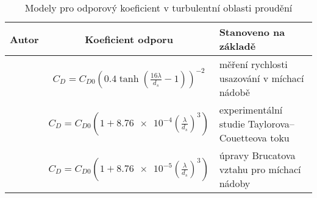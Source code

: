 \begin{table}[h!]
\begin{center}
  

		\caption{Modely pro odporový koeficient v turbulentní oblasti proudění}
		\label{tab:cds}
\begin{tabular}{|c|c|>{\centering\arraybackslash}p{5cm}|}
  \hline
  
{\textbf{Autor}} & {\textbf{Koeficient odporu}} & {\textbf{Stanoveno na základě}} \\ \hline{}

\citet{pin01} & \label{eq:pin} $C_{D} = C_{D0} \left( \num{0.4}\tanh\left(  \frac{16\lambda}{d_{s}} - 1  \right) \right) ^{-2}$ & měření rychlosti usazování v míchací nádobě \\ \hline
 
\citet{bru98} & \label{eq:bru} $C_{D} = C_{D0} \left( 1 + \num{8.76e-4} \left( \frac{\lambda}{d_{s}} \right)^{3} \right)$ & experimentální studie Taylorova–Couetteova toku \\ \hline 

\citet{kho06} & \label{eq:kho} $C_{D} = C_{D0} \left( 1 + \num{8.76e-5} \left( \frac{\lambda}{d_{s}} \right)^{3} \right)$ & úpravy Brucatova vztahu pro míchací nádoby  \\ \hline 

\end{tabular}
\end{center}
\end{table}








